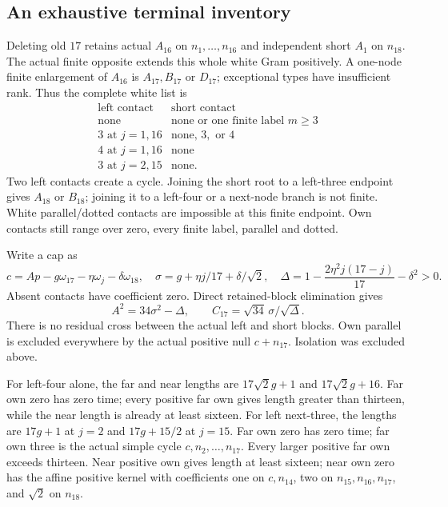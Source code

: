 \subsection{An exhaustive terminal inventory}
\label{app:B18inventory}
Deleting old \(17\) retains actual \(A_{16}\) on
\(n_1,\ldots,n_{16}\) and independent short \(A_1\) on \(n_{18}\).
The actual finite opposite extends this whole white Gram positively.
A one-node finite enlargement of \(A_{16}\) is \(A_{17},B_{17}\)
or \(D_{17}\); exceptional types have insufficient rank.
Thus the complete white list is
\[
\begin{array}{c|l}
\text{left contact}&\text{short contact}\\ \hline
\text{none}&\text{none or one finite label }m\geq3\\
3\text{ at }j=1,16&\text{none, }3,\text{ or }4\\
4\text{ at }j=1,16&\text{none}\\
3\text{ at }j=2,15&\text{none}.
\end{array}
\]
Two left contacts create a cycle. Joining the short root to a
left-three endpoint gives \(A_{18}\) or \(B_{18}\); joining it
to a left-four or a next-node branch is not finite.
White parallel/dotted contacts are impossible at this finite endpoint.
Own contacts still range over zero, every finite label, parallel
and dotted.

Write a cap as
\[
 c=A p-g\omega_{17}-\eta\omega_j-\delta\omega_{18},
\quad
 \sigma=g+\eta j/17+\delta/\sqrt2,\quad
 \Delta=1-\frac{2\eta^2j(17-j)}{17}-\delta^2>0.
\]
Absent contacts have coefficient zero.
Direct retained-block elimination gives
\[
 A^2=34\sigma^2-\Delta,\qquad
 C_{17}=\sqrt{34}\,\sigma/\sqrt\Delta.
\]
There is no residual cross between the actual left and short blocks.
Own parallel is excluded everywhere by the actual positive null
\(c+n_{17}\). Isolation was excluded above.

For left-four alone, the far and near lengths are
\(17\sqrt2g+1\) and \(17\sqrt2g+16\).
Far own zero has zero time; every positive far own gives length
greater than thirteen, while the near length is already at least
sixteen. For left next-three, the lengths are \(17g+1\) at \(j=2\)
and \(17g+15/2\) at \(j=15\). Far own zero has zero time;
far own three is the actual simple cycle
\(c,n_2,\ldots,n_{17}\). Every larger positive far own exceeds
thirteen. Near positive own gives length at least sixteen;
near own zero has the affine positive kernel with coefficients
one on \(c,n_{14}\), two on \(n_{15},n_{16},n_{17}\),
and \(\sqrt2\) on \(n_{18}\).

